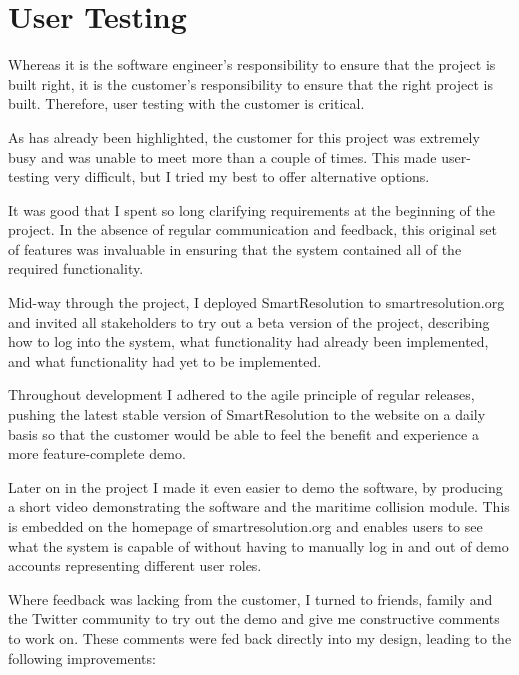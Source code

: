 \section{User Testing}

Whereas it is the software engineer's responsibility to ensure that the project is built right, it is the customer's responsibility to ensure that the right project is built. Therefore, user testing with the customer is critical.

As has already been highlighted, the customer for this project was extremely busy and was unable to meet more than a couple of times. This made user-testing very difficult, but I tried my best to offer alternative options.

It was good that I spent so long clarifying requirements at the beginning of the project. In the absence of regular communication and feedback, this original set of features was invaluable in ensuring that the system contained all of the required functionality.

Mid-way through the project, I deployed SmartResolution to smartresolution.org and invited all stakeholders to try out a beta version of the project, describing how to log into the system, what functionality had already been implemented, and what functionality had yet to be implemented.

Throughout development I adhered to the agile principle of regular releases, pushing the latest stable version of SmartResolution to the website on a daily basis so that the customer would be able to feel the benefit and experience a more feature-complete demo.

Later on in the project I made it even easier to demo the software, by producing a short video demonstrating the software and the maritime collision module. This is embedded on the homepage of smartresolution.org and enables users to see what the system is capable of without having to manually log in and out of demo accounts representing different user roles.

Where feedback was lacking from the customer, I turned to friends, family and the Twitter community to try out the demo and give me constructive comments to work on. These comments were fed back directly into my design, leading to the following improvements:

